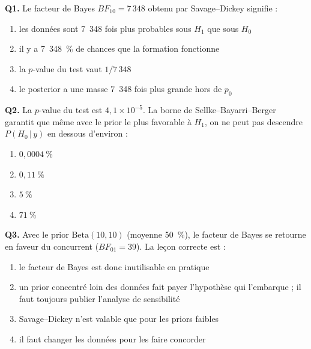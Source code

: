 \documentclass[11pt,a4paper]{article}
\newcommand{\given}{\,\vert\,}
\begin{document}
\begin{qcmbox}[Questions 1 à 3]
\textbf{Q1.} Le facteur de Bayes $BF_{10} = 7\,348$ obtenu par Savage--Dickey
signifie :
\begin{enumerate}[label=\Alph*.), leftmargin=8mm, itemsep=0.3mm]
  \item les données sont 7~348 fois plus probables sous $H_1$ que sous $H_0$
  \item il y a 7~348~\% de chances que la formation fonctionne
  \item la $p$-value du test vaut $1/7\,348$
  \item le posterior a une masse 7~348 fois plus grande hors de $p_0$
\end{enumerate}

\vspace{2mm}
\textbf{Q2.} La $p$-value du test est $4{,}1 \times 10^{-5}$. La borne de
Sellke--Bayarri--Berger garantit que même avec le prior le plus favorable à
$H_1$, on ne peut pas descendre $P(H_0 \given y)$ en dessous d'environ :
\begin{enumerate}[label=\Alph*.), leftmargin=8mm, itemsep=0.3mm]
  \item $0{,}0004~\%$
  \item $0{,}11~\%$
  \item $5~\%$
  \item $71~\%$
\end{enumerate}

\vspace{2mm}
\textbf{Q3.} Avec le prior $\text{Beta}(10,10)$ (moyenne 50~\%), le facteur
de Bayes se retourne en faveur du concurrent ($BF_{01} = 39$). La leçon
correcte est :
\begin{enumerate}[label=\Alph*.), leftmargin=8mm, itemsep=0.3mm]
  \item le facteur de Bayes est donc inutilisable en pratique
  \item un prior concentré loin des données fait payer l'hypothèse qui
        l'embarque ; il faut toujours publier l'analyse de sensibilité
  \item Savage--Dickey n'est valable que pour les priors faibles
  \item il faut changer les données pour les faire concorder
\end{enumerate}
\end{qcmbox}
\end{document}
